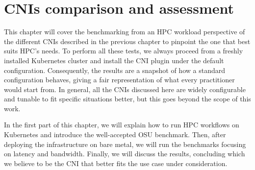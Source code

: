 \chapter{CNIs comparison and assessment}\label{chpt:osu}




This chapter will cover the benchmarking from an HPC workload perspective of the
different CNIs described in the previous chapter to pinpoint the one that best
suits HPC's needs. To perform all these tests, we always proceed from a freshly
installed Kubernetes cluster and install the CNI plugin under the default
configuration. Consequently, the results are a snapshot of how a standard
configuration behaves, giving a fair representation of what every practitioner
would start from. In general, all the CNIs discussed here are widely
configurable and tunable to fit specific situations better, but this goes beyond
the scope of this work. 

In the first part of this chapter, we will explain how to run HPC workflows on
Kubernetes and introduce the well-accepted OSU benchmark. Then, after deploying
the infrastructure on bare metal, we will run the benchmarks focusing on latency
and bandwidth. Finally, we will discuss the results, concluding which we believe
to be the CNI that better fits the use case under consideration. 


